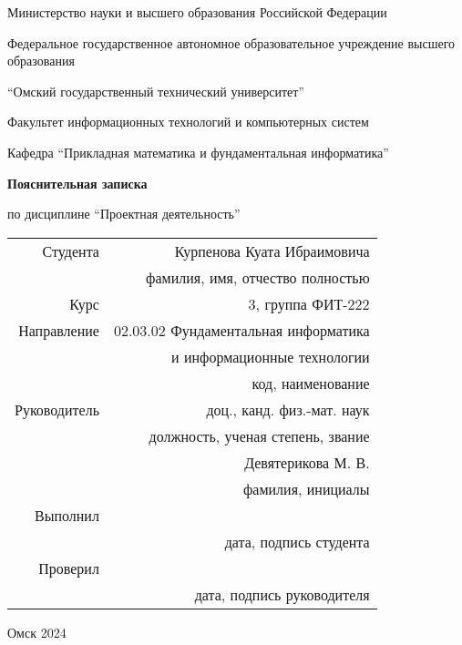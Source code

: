 \thispagestyle{empty}

\begin{center}
    Министерство науки и высшего образования Российской Федерации

    Федеральное государственное автономное образовательное учреждение высшего образования

    \enquote{Омский государственный технический университет}

    \vspace{1cm}
    Факультет информационных технологий и компьютерных систем

    Кафедра \enquote{Прикладная математика и фундаментальная информатика}

    \vspace{4cm}
    \textbf{Пояснительная записка}

    по дисциплине \enquote{Проектная деятельность}
\end{center}

\vspace{2cm}
\begin{flushright}    
    \begin{tabular}{ r r }
        Студента & Курпенова Куата Ибраимовича \\
        \cline{2-2}
        & \tiny{фамилия, имя, отчество полностью} \\

        Курс & 3, группа ФИТ-222 \\
        \cline{2-2}
        Направление & 02.03.02 Фундаментальная информатика \\
        \cline{2-2}
        & и информационные технологии \\
        \cline{2-2}
        & \tiny{код, наименование} \\

        Руководитель & доц., канд. физ.-мат. наук \\
        \cline{2-2}
        & \tiny{должность, ученая степень, звание} \\
        & Девятерикова М. В. \\
        \cline{2-2}
        & \tiny{фамилия, инициалы} \\

        Выполнил & \\
        \cline{2-2}
        & \tiny{дата, подпись студента} \\

        Проверил & \\
        \cline{2-2}
        & \tiny{дата, подпись руководителя} \\

    \end{tabular}
\end{flushright}

\vspace*{\fill}
\begin{center}
    Омск 2024
\end{center}
